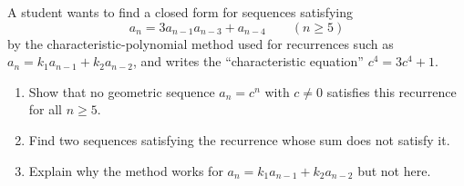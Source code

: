 A student wants to find a closed form for sequences satisfying
\[a_n=3a_{n-1}a_{n-3}+a_{n-4}\qquad(n\ge5)\]
by the characteristic-polynomial method used for recurrences such as $a_n=k_1a_{n-1}+k_2a_{n-2}$, and writes the ``characteristic equation'' $c^4=3c^4+1$.
\begin{enumerate}
\item[(a)] Show that no geometric sequence $a_n=c^n$ with $c\ne0$ satisfies this recurrence for all $n\ge5$.
\item[(b)] Find two sequences satisfying the recurrence whose sum does not satisfy it.
\item[(c)] Explain why the method works for $a_n=k_1a_{n-1}+k_2a_{n-2}$ but not here.
\end{enumerate}
